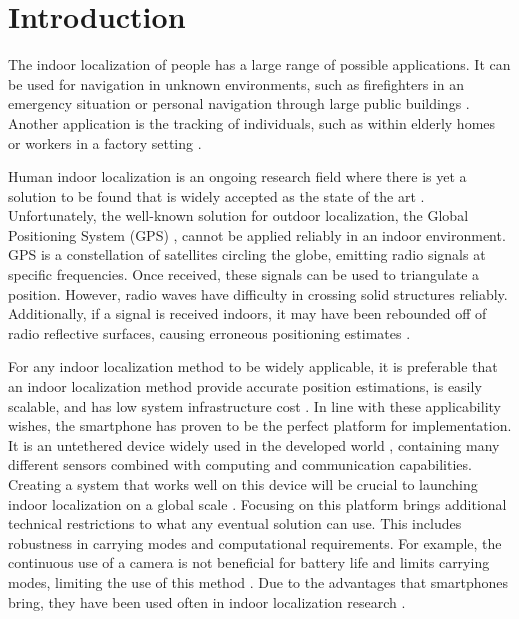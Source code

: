 
\chapter{Introduction} \label{chap:intro}

The indoor localization of people has a large range of possible applications. It can be used for navigation in unknown environments, such as firefighters in an emergency situation or personal navigation through large public buildings \cite{Correa2017, Jackermeier2018}. Another application is the tracking of individuals, such as within elderly homes or workers in a factory setting \cite{Correa2017}. \par

Human indoor localization is an ongoing research field where there is yet a solution to be found that is widely accepted as the state of the art \cite{Davidson2017}. Unfortunately, the well-known solution for outdoor localization, the Global Positioning System (GPS) \cite{Jackermeier2018}, cannot be applied reliably in an indoor environment. GPS is a constellation of satellites circling the globe, emitting radio signals at specific frequencies. Once received, these signals can be used to triangulate a position. However, radio waves have difficulty in crossing solid structures reliably. Additionally, if a signal is received indoors, it may have been rebounded off of radio reflective surfaces, causing erroneous positioning estimates \cite{Jackermeier2018}. \par 

For any indoor localization method to be widely applicable, it is preferable that an indoor localization method provide accurate position estimations, is easily scalable, and has low system infrastructure cost \cite{Correa2017}.
In line with these applicability wishes, the smartphone has proven to be the perfect platform for implementation. It is an untethered device widely used in the developed world \cite{Correa2017}, containing many different sensors combined with computing and communication capabilities.
Creating a system that works well on this device will be crucial to launching indoor localization on a global scale \cite{Gu2019}. Focusing on this platform brings additional technical restrictions to what any eventual solution can use. This includes robustness in carrying modes and computational requirements.  For example, the continuous use of a camera is not beneficial for battery life and limits carrying modes, limiting the use of this method \cite{Yang2014, Solin2018a}. Due to the advantages that smartphones bring, they have been used often in indoor localization research \cite{Jackermeier2018,Correa2017,Yang2014, Qian2013}. \par 

